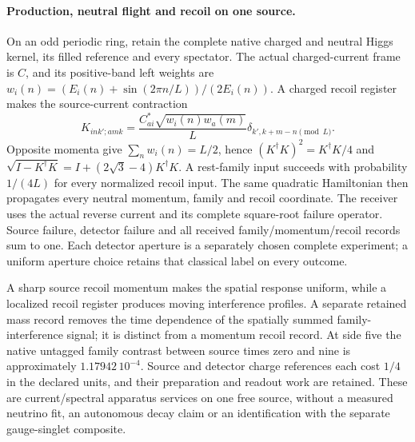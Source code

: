 \paragraph{Production, neutral flight and recoil on one source.}
On an odd periodic ring, retain the complete native charged and neutral Higgs
kernel, its filled reference and every spectator. The actual charged-current
frame is $C$, and its positive-band left weights are
$w_i(n)=(E_i(n)+\sin(2\pi n/L))/(2E_i(n))$. A charged recoil register makes the
source-current contraction
\[
 K_{i n k';a m k}=\frac{C_{ai}^*\sqrt{w_i(n)w_a(m)}}{L}
                   \delta_{k',k+m-n\pmod L}.
\]
Opposite momenta give $\sum_n w_i(n)=L/2$, hence
$(K^\dagger K)^2=K^\dagger K/4$ and
$\sqrt{I-K^\dagger K}=I+(2\sqrt3-4)K^\dagger K$.
A rest-family input succeeds with probability $1/(4L)$ for every normalized
recoil input. The same quadratic Hamiltonian then propagates every neutral
momentum, family and recoil coordinate. The receiver uses the actual reverse
current and its complete square-root failure operator. Source failure,
detector failure and all received family/momentum/recoil records sum to one.
Each detector aperture is a separately chosen complete experiment; a uniform
aperture choice retains that classical label on every outcome.

A sharp source recoil momentum makes the spatial response uniform, while a
localized recoil register produces moving interference profiles. A separate
retained mass record removes the time dependence of the spatially summed
family-interference signal; it is distinct from a momentum recoil record.
At side five the native untagged family contrast between source times zero
and nine is approximately $1.17942\,10^{-4}$. Source and detector charge
references each cost $1/4$ in the declared units, and their preparation and
readout work are retained. These are current/spectral apparatus services on
one free source, without a measured neutrino fit, an autonomous decay claim
or an identification with the separate gauge-singlet composite.
